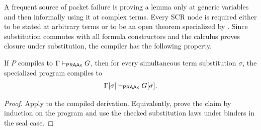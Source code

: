 A frequent source of packet failure is proving a lemma only at generic
variables and then informally using it at complex terms.  Every SCR node is
required either to be stated at arbitrary terms or to be an open theorem
specialized by .  Since substitution commutes with all formula
constructors and the calculus proves closure under substitution, the compiler
has the following property.

\begin{proposition}[Naturality]
If \(P\) compiles to \(\Gamma\mathrel{\vdash_{\mathsf{PRAAx}}} G\), then for every simultaneous term
substitution \(\sigma\), the specialized program compiles to
\[
  \Gamma[\sigma]\mathrel{\vdash_{\mathsf{PRAAx}}} G[\sigma].
\]
\end{proposition}

\begin{proof}
Apply  to the compiled derivation.  Equivalently, prove the
claim by induction on the program and use the checked substitution laws under
binders in the seal case.
\end{proof}
